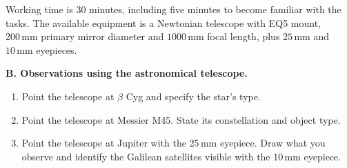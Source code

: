 Working time is 30 minutes, including five minutes to become familiar with
the tasks. The available equipment is a Newtonian telescope with EQ5 mount,
$200\,\mathrm{mm}$ primary mirror diameter and $1000\,\mathrm{mm}$ focal length,
plus $25\,\mathrm{mm}$ and $10\,\mathrm{mm}$ eyepieces.

\textbf{B. Observations using the astronomical telescope.}
\begin{enumerate}
\item Point the telescope at $\beta$ Cyg and specify the star's type.
\item Point the telescope at Messier M45. State its constellation and object type.
\item Point the telescope at Jupiter with the $25\,\mathrm{mm}$ eyepiece.
  Draw what you observe and identify the Galilean satellites visible with
  the $10\,\mathrm{mm}$ eyepiece.
\end{enumerate}
